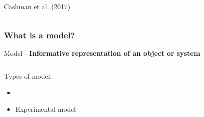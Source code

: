 \documentclass{beamer}
\begin{document}
\begin{frame}
\begin{columns}[t]
\begin{column}{0.5\paperwidth}
\begin{minipage}[t][.6\textheight][t]{\linewidth}
        \vspace{-0.2cm}
      
        \centering \tiny Cashman et al. (2017)

      \end{minipage}
      
    \end{column}

  \end{columns}
\end{frame}

\begin{frame}
  \frametitle{What is a model?}

  \vspace{-0.45cm}
  
  Model - \textbf{Informative representation of an object or system} \\

  \begin{columns}[t]

    \begin{column}{0.5\paperwidth}
      
      \begin{minipage}[t][.6\textheight][t]{\linewidth}

        Types of model:

        \begin{itemize}
        \item {\color{gray}{Conceptual model}}\\
        \item Experimental model
        \end{itemize}

      \end{minipage}
    
    \end{column}

    \begin{column}{0.5\paperwidth}

      \begin{minipage}[t][.6\textheight][t]{\linewidth}


      \end{minipage}
      
    \end{column}

  \end{columns}

  \vspace{-2cm}
  
 
\end{frame}
\end{document}
